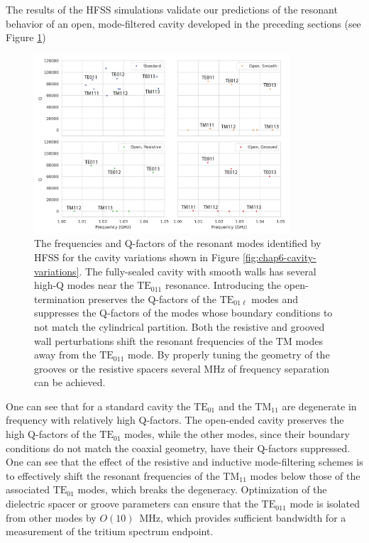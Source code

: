 The results of the HFSS simulations validate our predictions of the resonant behavior of an open, mode-filtered cavity developed in the preceding sections (see Figure \ref{fig:chap6-hfss-cavity-variation-results})
\begin{figure}[htbp]
    \centering
    \includegraphics*[width=0.85\textwidth]{figs/Chapter-6/230610_cavity_variation_eigenmodes_linear_annotate.png}
    \caption{\label{fig:chap6-hfss-cavity-variation-results} The frequencies and Q-factors of the resonant modes identified by HFSS for the cavity variations shown in Figure \ref{fig:chap6-cavity-variations}. The fully-sealed cavity with smooth walls has several high-Q modes near the $\mathrm{TE}_{011}$ resonance. Introducing the open-termination preserves the Q-factors of the $\mathrm{TE}_{01\ell}$ modes and suppresses the Q-factors of the modes whose boundary conditions to not match the cylindrical partition. Both the resistive and grooved wall perturbations shift the resonant frequencies of the $\mathrm{TM}$ modes away from the $\mathrm{TE}_{011}$ mode. By properly tuning the geometry of the grooves or the resistive spacers several MHz of frequency separation can be achieved. }
\end{figure}
One can see that for a standard cavity the $\mathrm{TE}_{01}$ and the $\mathrm{TM}_{11}$ are degenerate in frequency with relatively high Q-factors. The open-ended cavity preserves the high Q-factors of the $\mathrm{TE}_{01}$ modes, while the other modes, since their boundary conditions do not match the coaxial geometry, have their Q-factors suppressed. One can see that the effect of the resistive and inductive mode-filtering schemes is to effectively shift the resonant frequencies of the $\mathrm{TM}_{11}$ modes below those of the associated $\mathrm{TE}_{01}$ modes, which breaks the degeneracy. Optimization of the dielectric spacer or groove parameters can ensure that the $\mathrm{TE}_{011}$ mode is isolated from other modes by $O(10)$~MHz, which provides sufficient bandwidth for a measurement of the tritium spectrum endpoint.

